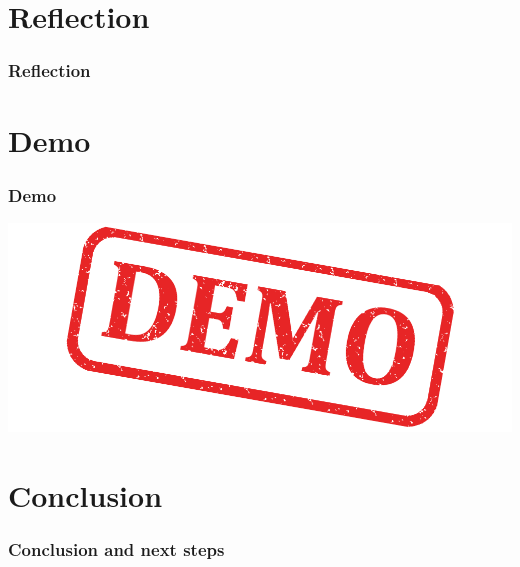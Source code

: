 \section{Reflection}

\begin{frame}
  \frametitle{Reflection}
\end{frame}

\section{Demo}

\begin{frame}
  \frametitle{Demo}
  \includegraphics[width=\textwidth]{images/demo}
\end{frame}

\section{Conclusion}

\begin{frame}
  \frametitle{Conclusion and next steps}
\end{frame}


